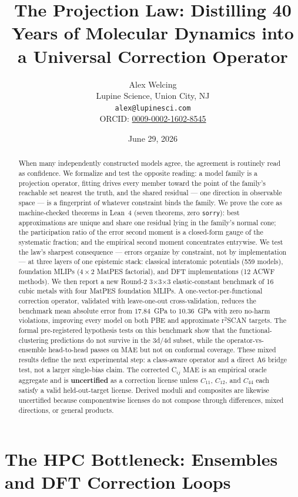 \documentclass[11pt]{article}
\title{\bfseries The Projection Law: Distilling 40 Years of Molecular Dynamics into a Universal Correction Operator}
\author{Alex Welcing\\ \small Lupine Science, Union City, NJ\\ \small \texttt{alex@lupinesci.com}\\ \small ORCID: \href{https://orcid.org/0009-0002-1602-8545}{0009-0002-1602-8545}}
\date{June 29, 2026}
\begin{document}
\maketitle

\begin{abstract}
\noindent
When many independently constructed models agree, the agreement is routinely
read as confidence. We formalize and test the opposite reading: a model family
is a projection operator, fitting drives every member toward the point of the
family's reachable set nearest the truth, and the shared residual --- one
direction in observable space --- is a fingerprint of whatever constraint binds
the family. We prove the core as machine-checked theorems in Lean~4 (seven
theorems, zero \texttt{sorry}): best approximations are unique and share one
residual lying in the family's normal cone; the participation ratio of the
error second moment is a closed-form gauge of the systematic fraction; and the
empirical second moment concentrates entrywise. We test the law's sharpest
consequence --- errors organize by constraint, not by implementation --- at
three layers of one epistemic stack: classical interatomic potentials (559
models), foundation MLIPs ($4{\times}2$ MatPES factorial), and DFT
implementations (12 ACWF methods). We then report a new Round-2 3$\times$3$\times$3
elastic-constant benchmark of 16 cubic metals with four MatPES foundation MLIPs.
A one-vector-per-functional correction operator, validated with leave-one-out
cross-validation, reduces the benchmark mean absolute error from $17.84$~GPa to
$10.36$~GPa with zero no-harm violations, improving every model on both PBE and
approximate r$^2$SCAN targets. The formal pre-registered hypothesis tests on
this benchmark show that the functional-clustering predictions do not survive
in the 3d/4d subset, while the operator-vs-ensemble head-to-head passes on MAE
but not on conformal coverage. These mixed results define the next experimental
step: a class-aware operator and a direct A6 bridge test, not a larger
single-bias claim. The corrected C$_{ij}$ MAE is an empirical oracle aggregate
and is \textbf{uncertified} as a correction license unless $C_{11}$, $C_{12}$,
and $C_{44}$ each satisfy a valid held-out-target license. Derived moduli and
composites are likewise uncertified because componentwise licenses do not
compose through differences, mixed directions, or general products.
\end{abstract}

\section{The HPC Bottleneck: Ensembles and DFT Correction Loops}
\label{sec:hpc}
\end{document}
